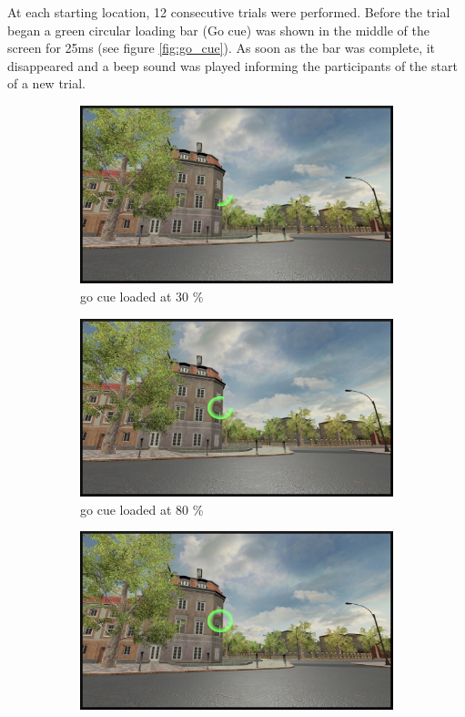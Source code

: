 At each starting location, 12 consecutive trials were performed. Before the trial began a green circular loading bar {\emphasize (Go cue)} was shown in the middle of the screen for 25ms (see figure \ref{fig:go_cue}). As soon as the bar was complete, it disappeared and a beep sound was played informing the participants of the start of a new trial. 

\begin{figure}[!htb]
	\centering
	\begin{subfigure}[b]{0.3\linewidth}
		\includegraphics[width=\linewidth]{figures/go_cue_30.jpg}
		\caption{go cue loaded at 30 \%}
		\label{fig:go_cue_30}
	\end{subfigure}
	\begin{subfigure}[b]{0.3\linewidth}
		\includegraphics[width=\linewidth]{figures/go_cue_80.jpg}
		\caption{go cue loaded at 80 \%}
		\label{fig:go_cue_80}
	\end{subfigure}
	\begin{subfigure}[b]{0.3\linewidth}
		\includegraphics[width=\linewidth]{figures/go_cue_full.jpg}

\end{subfigure}
\end{figure}
